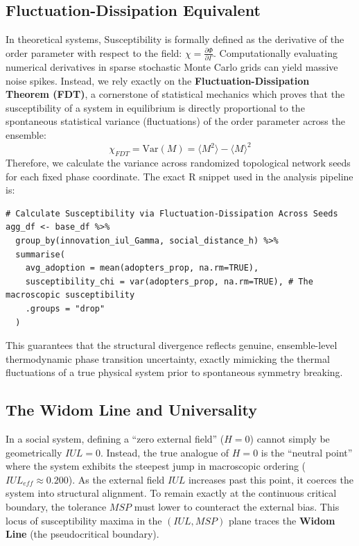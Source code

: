 \documentclass[11pt]{article}
\begin{document}
\subsection{Fluctuation-Dissipation Equivalent}
In theoretical systems, Susceptibility is formally defined as the derivative of the order parameter with respect to the field: $\chi = \frac{\partial \Phi}{\partial \Gamma}$. Computationally evaluating numerical derivatives in sparse stochastic Monte Carlo grids can yield massive noise spikes. Instead, we rely exactly on the \textbf{Fluctuation-Dissipation Theorem (FDT)}, a cornerstone of statistical mechanics which proves that the susceptibility of a system in equilibrium is directly proportional to the spontaneous statistical variance (fluctuations) of the order parameter across the ensemble:
\begin{equation}
    \chi_{FDT} = \text{Var}(M) = \langle M^2 \rangle - \langle M \rangle^2
\end{equation}
Therefore, we calculate the variance across randomized topological network seeds for each fixed phase coordinate. The exact R snippet used in the analysis pipeline is:
\begin{verbatim}
# Calculate Susceptibility via Fluctuation-Dissipation Across Seeds
agg_df <- base_df %>%
  group_by(innovation_iul_Gamma, social_distance_h) %>%
  summarise(
    avg_adoption = mean(adopters_prop, na.rm=TRUE),
    susceptibility_chi = var(adopters_prop, na.rm=TRUE), # The macroscopic susceptibility
    .groups = "drop"
  )
\end{verbatim}
This guarantees that the structural divergence reflects genuine, ensemble-level thermodynamic phase transition uncertainty, exactly mimicking the thermal fluctuations of a true physical system prior to spontaneous symmetry breaking.

\subsection{The Widom Line and Universality}
In a social system, defining a ``zero external field'' ($H=0$) cannot simply be geometrically $IUL=0$. Instead, the true analogue of $H=0$ is the ``neutral point'' where the system exhibits the steepest jump in macroscopic ordering ($IUL_{eff} \approx 0.200$). 
As the external field $IUL$ increases past this point, it coerces the system into structural alignment. To remain exactly at the continuous critical boundary, the tolerance $MSP$ must lower to counteract the external bias. This locus of susceptibility maxima in the $(IUL, MSP)$ plane traces the \textbf{Widom Line} (the pseudocritical boundary). 
\end{document}
